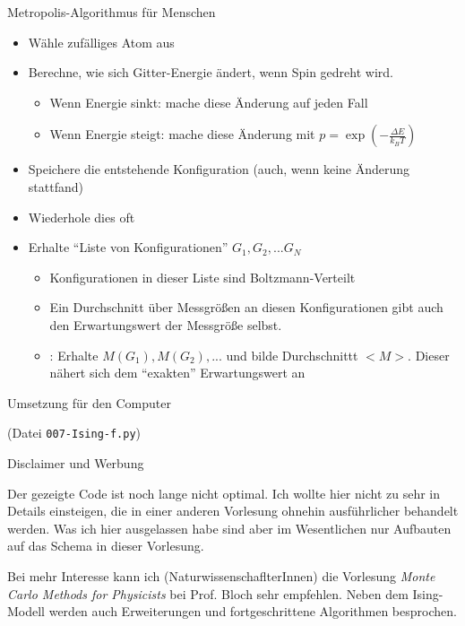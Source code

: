 
\begin{frame}{Metropolis-Algorithmus für Menschen}
%
\begin{itemize}
\item Wähle zufälliges Atom aus
\item Berechne, wie sich Gitter-Energie ändert, wenn Spin gedreht wird.
	\begin{itemize}
	\item Wenn Energie sinkt: mache diese Änderung auf jeden Fall
	\item Wenn Energie steigt: mache diese Änderung mit $p = \exp(-\frac{\Delta E}{k_B T})$
	\end{itemize}
\item Speichere die entstehende Konfiguration (auch, wenn keine Änderung stattfand)
\item Wiederhole dies oft
\item[\Thus] Erhalte \enquote{Liste von Konfigurationen} $G_1, G_2, ... G_N$
	\begin{itemize}
	\item Konfigurationen in dieser Liste sind Boltzmann-Verteilt
	\item Ein Durchschnitt über Messgrößen an diesen Konfigurationen gibt auch den Erwartungswert der Messgröße selbst.
	\item \zB: Erhalte $M(G_1), M(G_2), ...$ und bilde Durchschnittt $<M>$. Dieser nähert sich dem \enquote{exakten} Erwartungswert an
	\end{itemize}
\end{itemize}
%
\end{frame}


\begin{frame}{Umsetzung für den Computer}
%
\begin{center}
(Datei \texttt{007-Ising-f.py})
\end{center}
%
\end{frame}


\begin{frame}{Disclaimer und Werbung}
%
\begin{hintbox}
Der gezeigte Code ist noch lange nicht optimal. Ich wollte hier nicht zu sehr in Details einsteigen, die in einer anderen Vorlesung ohnehin ausführlicher behandelt werden. Was ich hier ausgelassen habe sind aber im Wesentlichen nur Aufbauten auf das Schema in dieser Vorlesung.

Bei mehr Interesse kann ich (NaturwissenschaflterInnen) die Vorlesung \emph{Monte Carlo Methods for Physicists} bei Prof. Bloch sehr empfehlen. Neben dem Ising-Modell werden auch Erweiterungen und fortgeschrittene Algorithmen besprochen.
\end{hintbox}
%
\end{frame}
